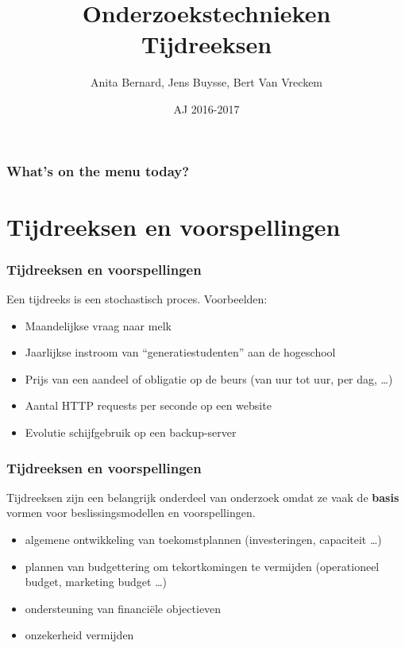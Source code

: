 \documentclass{beamer}
\title[Intro]{Onderzoekstechnieken\\Tijdreeksen}
\author{Anita Bernard, Jens Buysse, Bert {Van Vreckem}}
\date{AJ 2016-2017}
\begin{document}

\HoGentLogo

\titleframe


\begin{frame}
  \frametitle{What's on the menu today?}

  \tableofcontents
\end{frame}

\section{Tijdreeksen en voorspellingen}

\begin{frame}
  \frametitle{Tijdreeksen en voorspellingen}


  Een tijdreeks is een stochastisch proces. Voorbeelden:

  \begin{itemize}
    \item Maandelijkse vraag naar melk
    \item Jaarlijkse instroom van ``generatiestudenten'' aan de hogeschool
    \item Prijs van een aandeel of obligatie op de beurs (van uur tot uur, per dag, \dots)
    \item Aantal HTTP requests per seconde op een website
    \item Evolutie schijfgebruik op een backup-server
  \end{itemize}
\end{frame}

\begin{frame}
  \frametitle{Tijdreeksen en voorspellingen}

  Tijdreeksen zijn een belangrijk onderdeel van onderzoek omdat ze vaak de \textbf{basis} vormen voor beslissingsmodellen en voorspellingen.

  \begin{itemize}
    \item algemene ontwikkeling van toekomstplannen (investeringen, capaciteit \dots)
    \item plannen van budgettering om tekortkomingen te vermijden (operationeel budget, marketing budget \dots)
    \item ondersteuning van financi\"ele objectieven
    \item onzekerheid vermijden
  \end{itemize}
\end{frame}
\end{document}
